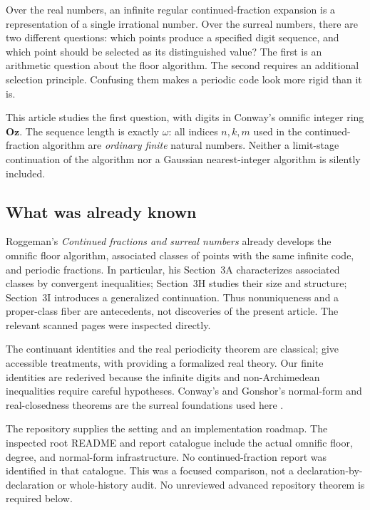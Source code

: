 \documentclass[11pt,a4paper]{article}
\numberwithin{equation}{section}
\theoremstyle{definition}
\theoremstyle{remark}
\newcommand{\Oz}{\mathbf{Oz}}
\begin{document}
Over the real numbers, an infinite regular continued-fraction expansion is a
representation of a single irrational number. Over the surreal numbers,
there are two different questions: which points produce a specified digit
sequence, and which point should be selected as its distinguished value?
The first is an arithmetic question about the floor algorithm. The second
requires an additional selection principle. Confusing them makes a periodic
code look more rigid than it is.

This article studies the first question, with digits in Conway's omnific
integer ring $\Oz$. The sequence length is exactly $\omega$: all indices
$n,k,m$ used in the continued-fraction algorithm are \emph{ordinary finite}
natural numbers. Neither a limit-stage continuation of the algorithm nor a
Gaussian nearest-integer algorithm is silently included.

\subsection{What was already known}
\label{ocf:sub:known}

Roggeman's \emph{Continued fractions and surreal numbers}
\cite{Roggeman} already develops the omnific floor algorithm, associated
classes of points with the same infinite code, and periodic fractions. In
particular, his Section~3A characterizes associated classes by convergent
inequalities; Section~3H studies their size and structure; Section~3I
introduces a generalized continuation. Thus nonuniqueness and a
proper-class fiber are antecedents, not discoveries of the present article.
The relevant scanned pages were inspected directly.

The continuant identities and the real periodicity theorem are classical;
\cite{Krishnan,Eberl} give accessible treatments, with \cite{Eberl} providing
a formalized real theory. Our finite identities are rederived because the
infinite digits and non-Archimedean inequalities require careful hypotheses.
Conway's and Gonshor's normal-form and real-closedness theorems are the
surreal foundations used here \cite{Conway,Gonshor}.

The repository \cite{SurrealRepo} supplies the setting and an implementation
roadmap. The inspected root README and report catalogue include the actual
omnific floor, degree, and normal-form infrastructure. No continued-fraction
report was identified in that catalogue. This was a focused comparison, not
a declaration-by-declaration or whole-history audit. No unreviewed advanced
repository theorem is required below.
\end{document}
